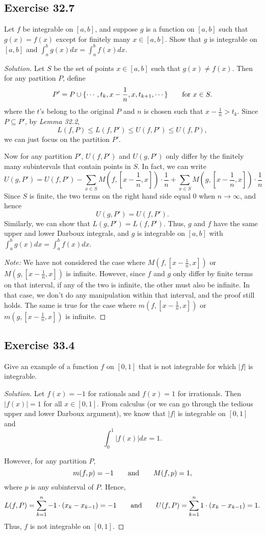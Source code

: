 \documentclass{article}
\begin{document}
\subsection*{Exercise 32.7}
Let $f$ be integrable on $[a, b]$, and suppose $g$ is a function on $[a,b]$ such that 
$g(x)=f(x)$ except for finitely many $x\in[a,b]$. Show that $g$ is integrable on $[a,b]$
and $\int_a^b g(x)dx=\int_a^b f(x)dx$.
\begin{proof}[Solution]
    Let $S$ be the set of points $x\in[a,b]$ such that $g(x)\neq f(x)$. Then for any partition $P$,
    define 
    \[
        P' = P\cup \{\cdots, t_k, x-\frac{1}{n}, x, t_{k+1},\cdots\} \qquad \text{for } x\in S.
    \]
    where the $t$'s belong to the original $P$ and $n$ is chosen such that $x-\frac{1}{n}>t_k$.
    Since $P\subseteq P'$, by \emph{Lemma 32.2}, 
    \[
        L(f,P)\le L(f,P')\le U(f,P')\le U(f,P),  
    \]
    we can just focus on the partition $P'$. 

    Now for any partition $P'$, 
    $U(f,P')$ and $U(g,P')$ only differ by the finitely many subintervals that contain points in $S$.
    In fact, we can write 
    \[
        U(g,P') = U(f,P') - \sum_{x\in S}M(f, [x-\frac{1}{n}, x])\cdot \frac{1}{n} + 
        \sum_{x\in S}M(g, [x-\frac{1}{n}, x])\cdot \frac{1}{n}
    \]
    Since $S$ is finite, the two terms on the right hand side equal 0 when $n\to \infty$, and hence 
    \[
        U(g,P') = U(f,P').
    \]
    Similarly, we can show that $L(g,P') = L(f,P')$. Thus, $g$ and $f$ have the same upper and lower
    Darboux integrals, and $g$ is integrable on $[a,b]$ with $\int_a^b g(x)dx=\int_a^b f(x)dx$.

    \emph{Note:} We have not considered the case where $M(f, [x-\frac{1}{n},x])$ or 
    $M(g, [x-\frac{1}{n},x])$ is infinite. However, since $f$ and $g$ only differ by finite terms
    on that interval, if any of the two is infinite, the other must also be infinite. In that case, 
    we don't do any manipulation within that interval, and the proof still holds. 
    The same is true for the case where $m(f, [x-\frac{1}{n},x])$ or
    $m(g, [x-\frac{1}{n},x])$ is infinite.
\end{proof}


\newpage
\subsection*{Exercise 33.4}
Give an example of a function $f$ on $[0,1]$ that is not integrable for which 
$|f|$ is integrable.
\begin{proof}[Solution]
    Let $f(x)=-1$ for rationals and $f(x)=1$ for irrationals. Then $|f(x)|=1$ for all $x\in[0,1]$.
    From calculus (or we can go through the tedious upper and lower Darboux argument), we know 
    that $|f|$ is integrable on $[0,1]$ and 
    \[
        \int_0^1 |f(x)|dx = 1.
    \]
    
    However, for any partition $P$, 
    \[
      m(f, p) = -1 \qquad \text{and} \qquad M(f, p) = 1,  
    \]
    where $p$ is any subinterval of $P$. 
    Hence, 
    \[
        L(f,P) = \sum_{k=1}^{n} -1\cdot (x_k-x_{k-1}) = -1 \qquad \text{and} \qquad 
        U(f,P) = \sum_{k=1}^{n} 1\cdot (x_k-x_{k-1}) = 1.    
    \]
    Thus, $f$ is not integrable on $[0,1]$.
\end{proof}
\end{document}
